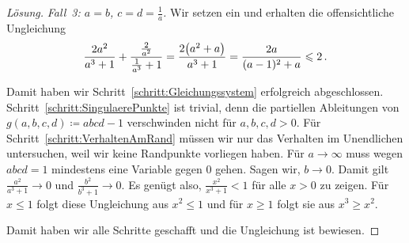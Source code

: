 \begin{proof}[Lösung]
	\emph{Fall~3: $a=b$, $c=d=\frac1a$.} Wir setzen ein und erhalten die offensichtliche Ungleichung
	\begin{equation*}
		\frac{2a^2}{a^3+1}+\frac{\frac{2}{a^2}}{\frac1{a^3}+1}=\frac{2\parens*{a^2+a}}{a^3+1}=\frac{2a}{(a-1)^2+a}\leqslant 2\,.
	\end{equation*}
	
	Damit haben wir Schritt~\ref{schritt:Gleichungssystem} erfolgreich abgeschlossen. Schritt~\ref{schritt:SingulaerePunkte} ist trivial, denn die partiellen Ableitungen von $g(a,b,c,d)\coloneqq abcd-1$ verschwinden nicht für $a,b,c,d>0$. Für Schritt~\ref{schritt:VerhaltenAmRand} müssen wir nur das Verhalten im Unendlichen untersuchen, weil wir keine Randpunkte vorliegen haben. Für $a\rightarrow \infty$ muss wegen $abcd=1$ mindestens eine Variable gegen $0$ gehen. Sagen wir, $b\rightarrow 0$. Damit gilt $\frac{a^2}{a^3+1}\rightarrow 0$ und $\frac{b^2}{b^3+1}\rightarrow 0$. Es genügt also, $\frac{x^2}{x^3+1}< 1$ für alle $x>0$ zu zeigen. Für $x\leqslant 1$ folgt diese Ungleichung aus $x^2\leqslant 1$ und für $x\geqslant 1$ folgt sie aus $x^3\geqslant x^2$.
	
	Damit haben wir alle Schritte geschafft und die Ungleichung ist bewiesen.
\end{proof}



